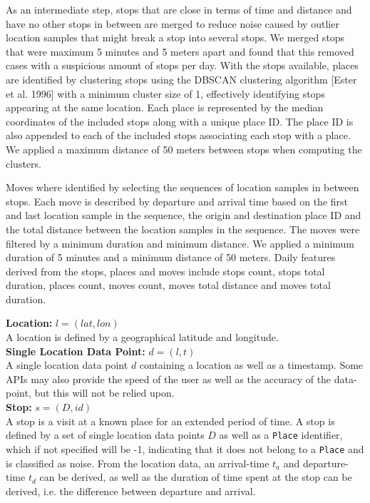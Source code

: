 As an intermediate step, stops that are close in terms of time and distance and have no other stops in between are merged to reduce noise caused by outlier location samples that might break a stop into several stops. We merged stops that were maximum 5 minutes and 5 meters apart and found that this removed cases with a suspicious amount of stops per day. With the stops available, places are identified by clustering stops using the DBSCAN clustering algorithm [Ester et al. 1996] with a minimum cluster size of 1, effectively identifying stops appearing at the same location. Each place is represented by the median coordinates of the included stops along with a unique place ID. The place ID is also appended to each of the included stops associating each stop with a place. We applied a maximum distance of 50 meters between stops when computing the clusters.

Moves where identified by selecting the sequences of location samples in between stops. Each move is described by departure and arrival time based on the first and last location sample in the sequence, the origin and destination place ID and the total distance between the location samples in the sequence. The moves were filtered by a minimum duration and minimum distance. We applied a minimum duration of 5 minutes and a minimum distance of 50 meters. Daily features derived from the stops, places and moves include stops count, stops total duration, places count, moves count, moves total distance and moves total duration.

\textbf{Location:} $l = (lat, lon)$ \\ 
A location is defined by a geographical latitude and longitude. \\

\textbf{Single Location Data Point:} $d = (l, t)$\\
A single location data point $d$ containing a location as well as a timestamp. Some APIs may also provide the speed of the user as well as the accuracy of the data-point, but this will not be relied upon.\\

\textbf{Stop:} $s = (D, id)$\\
A stop is a visit at a known place for an extended period of time. A stop is defined by a set of single location data points $D$ as well as a \verb|Place| identifier, which if not specified will be -1, indicating that it does not belong to a \verb|Place| and is classified as noise. From the location data, an arrival-time $t_a$ and departure-time $t_d$ can be derived, as well as the duration of time spent at the stop can be derived, i.e. the difference between departure and arrival.\\

